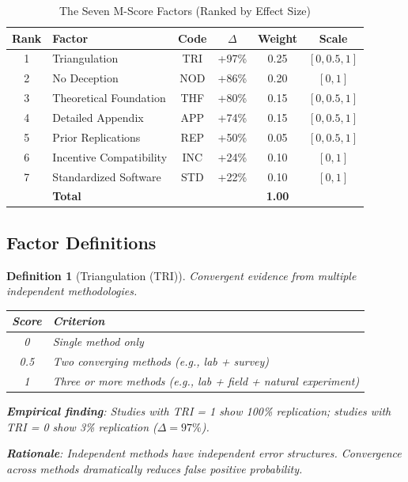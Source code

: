 \documentclass[11pt,a4paper]{article}
\newtheorem{definition}{Definition}[section]
\begin{document}
\begin{table}[h]
\centering
\caption{The Seven M-Score Factors (Ranked by Effect Size)}
\label{tab:factors}
\begin{tabular}{clcccc}
\toprule
\textbf{Rank} & \textbf{Factor} & \textbf{Code} & \textbf{$\Delta$} & \textbf{Weight} & \textbf{Scale} \\
\midrule
1 & Triangulation & TRI & +97\% & 0.25 & $[0, 0.5, 1]$ \\
2 & No Deception & NOD & +86\% & 0.20 & $[0, 1]$ \\
3 & Theoretical Foundation & THF & +80\% & 0.15 & $[0, 0.5, 1]$ \\
4 & Detailed Appendix & APP & +74\% & 0.15 & $[0, 0.5, 1]$ \\
5 & Prior Replications & REP & +50\% & 0.05 & $[0, 0.5, 1]$ \\
6 & Incentive Compatibility & INC & +24\% & 0.10 & $[0, 1]$ \\
7 & Standardized Software & STD & +22\% & 0.10 & $[0, 1]$ \\
\midrule
& \textbf{Total} & & & \textbf{1.00} & \\
\bottomrule
\end{tabular}
\end{table}

\subsection{Factor Definitions}

\begin{definition}[Triangulation (TRI)]
\label{def:tri}
Convergent evidence from multiple independent methodologies.

\begin{center}
\begin{tabular}{cl}
\toprule
\textbf{Score} & \textbf{Criterion} \\
\midrule
0 & Single method only \\
0.5 & Two converging methods (e.g., lab + survey) \\
1 & Three or more methods (e.g., lab + field + natural experiment) \\
\bottomrule
\end{tabular}
\end{center}

\textbf{Empirical finding}: Studies with TRI = 1 show 100\% replication; studies with TRI = 0 show 3\% replication ($\Delta = 97\%$).

\textbf{Rationale}: Independent methods have independent error structures. Convergence across methods dramatically reduces false positive probability.
\end{definition}
\end{document}
